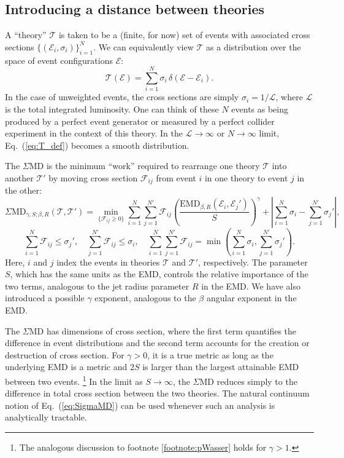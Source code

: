 \documentclass[letterpaper,11pt]{article}
\DeclareRobustCommand{\Eq}[1]{Eq.~(\ref{#1})}
\begin{document}
\subsection{Introducing a distance between theories}


A ``theory'' $\mathcal T$ is taken to be a (finite, for now) set of events with associated cross sections $\{(\mathcal E_i,\sigma_i)\}_{i=1}^N$.
%
We can equivalently view $\mathcal T$ as a distribution over the space of event configurations $\mathcal E$:
%
\begin{equation}
\label{eq:T_def}
\mathcal{T}(\mathcal E) = \sum_{i = 1}^N \sigma_i \, \delta(\mathcal E - \mathcal E_i).
\end{equation}
%
In the case of unweighted events, the cross sections are simply $\sigma_i = 1/\mathcal{L}$, where $\mathcal{L}$ is the total integrated luminosity.
%
One can think of these $N$ events as being produced by a perfect event generator or measured by a perfect collider experiment in the context of this theory.
%
In the $\mathcal{L} \to \infty$ or $N\to\infty$ limit, \Eq{eq:T_def} becomes a smooth distribution.


The $\Sigma$MD is the minimum ``work'' required to rearrange one theory $\mathcal T$ into another $\mathcal T'$ by moving cross section $\mathcal F_{ij}$ from event $i$ in one theory to event $j$ in the other:
%
\begin{equation}
\label{eq:SigmaMD}
\text{$\Sigma$MD}_{\gamma,S; \beta, R}(\mathcal T, \mathcal T') = \min_{\{\mathcal F_{ij}\ge0\}} \sum_{i=1}^N\sum_{j=1}^{N'}  \mathcal F_{ij} \left(\frac{\text{EMD}_{\beta, R}(\mathcal E_i, \mathcal E_j')}{S} \right)^\gamma + \left|\sum_{i=1}^N \sigma_i - \sum_{j=1}^{N'}\sigma_j'\right|,
\end{equation}
%
\begin{equation}
\sum_{i=1}^N \mathcal F_{ij} \le \sigma_j', \quad \sum_{j=1}^{N'} \mathcal F_{ij} \le \sigma_i, \quad \sum_{i=1}^N\sum_{j=1}^{N'} \mathcal F_{ij} = \min\left(\sum_{i=1}^N \sigma_i,\sum_{j=1}^{N'}\sigma_j'\right).
\end{equation}
%
Here, $i$ and $j$ index the events in theories $\mathcal T$ and $\mathcal T'$, respectively. 
%
The parameter $S$, which has the same units as the EMD, controls the relative importance of the two terms, analogous to the jet radius parameter $R$ in the EMD.
%
We have also introduced a possible $\gamma$ exponent, analogous to the $\beta$ angular exponent in the EMD.


The $\Sigma$MD has dimensions of cross section, where the first term quantifies the difference in event distributions and the second term accounts for the creation or destruction of cross section.
%
For $\gamma > 0$, it is a true metric as long as the underlying EMD is a metric and $2S$ is larger than the largest attainable EMD between two events.%
%
\footnote{The analogous discussion to footnote \ref{footnote:pWasser} holds for $\gamma > 1$.}
%
In the limit as $S\to\infty$, the $\Sigma$MD reduces simply to the difference in total cross section between the two theories.
%
The natural continuum notion of \Eq{eq:SigmaMD} can be used whenever such an analysis is analytically tractable.
\end{document}

